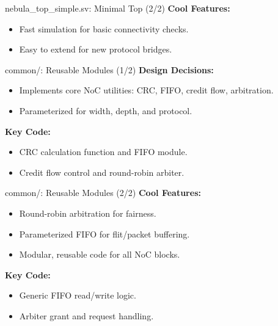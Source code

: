 \documentclass{beamer}
\begin{document}
\begin{frame}{nebula\_top\_simple.sv: Minimal Top (2/2)}
  \textbf{Cool Features:}
  \begin{itemize}
    \item Fast simulation for basic connectivity checks.
    \item Easy to extend for new protocol bridges.
  \end{itemize}
\end{frame}

\begin{frame}{common/: Reusable Modules (1/2)}
  \textbf{Design Decisions:}
  \begin{itemize}
    \item Implements core NoC utilities: CRC, FIFO, credit flow, arbitration.
    \item Parameterized for width, depth, and protocol.
  \end{itemize}
  \textbf{Key Code:}
  \begin{itemize}
    \item CRC calculation function and FIFO module.
    \item Credit flow control and round-robin arbiter.
  \end{itemize}
\end{frame}

\begin{frame}{common/: Reusable Modules (2/2)}
  \textbf{Cool Features:}
  \begin{itemize}
    \item Round-robin arbitration for fairness.
    \item Parameterized FIFO for flit/packet buffering.
    \item Modular, reusable code for all NoC blocks.
  \end{itemize}
  \textbf{Key Code:}
  \begin{itemize}
    \item Generic FIFO read/write logic.
    \item Arbiter grant and request handling.
  \end{itemize}
\end{frame}
\end{document}
